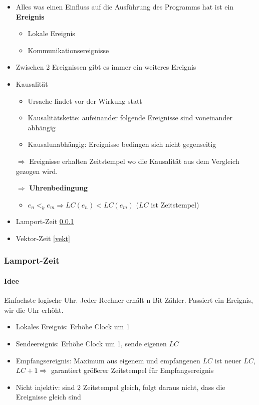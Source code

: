 \documentclass{scrartcl}
\begin{document}
\begin{itemize}
\item Alles was einen Einfluss auf die Ausführung des Programms hat ist ein \textbf{Ereignis}
\begin{itemize}
\item Lokale Ereignis
\item Kommunikationsereignisse
\end{itemize}
\item Zwischen 2 Ereignissen gibt es immer ein weiteres Ereignis
\item Kausalität
\begin{itemize}
\item Ursache findet vor der Wirkung statt
\item Kausalitätskette: aufeinander folgende Ereignisse sind voneinander abhängig
\item Kausalunabhängig: Ereignisse bedingen sich nicht gegenseitig
\end{itemize}
\item[$\Rightarrow$] Ereignisse erhalten Zeitstempel wo die Kausalität aus dem Vergleich gezogen wird. 
\item[$\Rightarrow$] \textbf{Uhrenbedingung}
\begin{itemize}
\item $e_n <_k e_m \Rightarrow LC(e_n) < LC(e_m)$ ($LC$ ist Zeitstempel) 
\end{itemize}
\item Lamport-Zeit \ref{lamp}
\item Vektor-Zeit \ref{vekt}
\end{itemize}




\subsubsection{Lamport-Zeit } \label{lamp}
\paragraph{Idee} Einfachste logische Uhr. Jeder Rechner erhält n Bit-Zähler. Passiert ein Ereignis, wir die Uhr erhöht.

\begin{itemize}
\item Lokales Ereignis: Erhöhe Clock um 1
\item Sendeereignis: Erhöhe Clock um 1, sende eigenen $LC$
\item Empfangsereignis: Maximum aus eigenem und empfangenen $LC$ ist neuer $LC$, $LC + 1 \Rightarrow$ garantiert größerer Zeitstempel für Empfangsereignis
\item Nicht injektiv: sind 2 Zeitstempel gleich, folgt daraus nicht, dass die Ereignisse gleich sind
\end{itemize}
\end{document}
